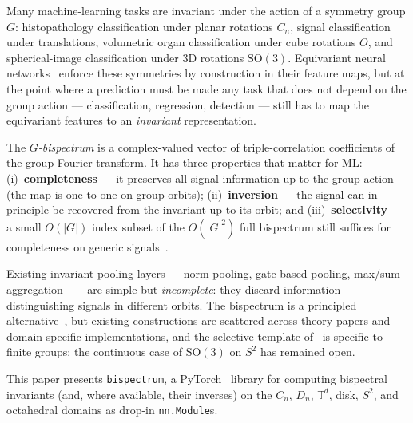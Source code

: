 \documentclass{article}
\theoremstyle{definition}
\theoremstyle{remark}
\newcommand{\SO}{\mathrm{SO}}
\theoremstyle{definition}
\begin{document}
Many machine-learning tasks are invariant under the action of a symmetry
group $G$: histopathology classification under planar
rotations $C_n$, signal classification under translations,
volumetric organ classification under cube rotations $O$, and
spherical-image classification under 3D rotations $\SO(3)$. Equivariant
neural networks~\citep{cohen2016group, weiler2019general} enforce these
symmetries by construction in their feature maps, but at the point where
a prediction must be made any task that does not depend on the group
action --- classification, regression, detection --- still has to map
the equivariant features to an \emph{invariant} representation.

The \emph{$G$-bispectrum} is a complex-valued vector of triple-correlation
coefficients of the group Fourier transform. It has three properties that
matter for ML: (i)~\textbf{completeness} --- it preserves all signal
information up to the group action (the map is one-to-one on group
orbits); (ii)~\textbf{inversion} --- the signal can in principle be
recovered from the invariant up to its orbit; and
(iii)~\textbf{selectivity} --- a small $O(|G|)$ index subset of the
$O(|G|^2)$ full bispectrum still suffices for completeness on generic
signals~\citep{mataigne2024selective}.

Existing invariant pooling layers --- norm pooling, gate-based
pooling, max/sum
aggregation~\citep{weiler2019general} --- are simple but
\emph{incomplete}: they discard information distinguishing signals
in different orbits. The bispectrum is a principled
alternative~\citep{giannakis1989bispectrum, kakarala2012bispectrum,
sanborn2023bispectral, mataigne2024selective}, but existing
constructions are scattered across theory papers and
domain-specific implementations, and the selective template
of~\citet{mataigne2024selective} is specific to finite groups; the
continuous case of $\SO(3)$ on $S^2$ has remained open.

This paper presents \texttt{bispectrum}, a
PyTorch~\citep{paszke2019pytorch} library for computing bispectral
invariants (and, where available, their inverses) on the $C_n$,
$D_n$, $\mathbb{T}^d$, disk, $S^2$, and octahedral domains as
drop-in \texttt{nn.Module}s.
\end{document}
